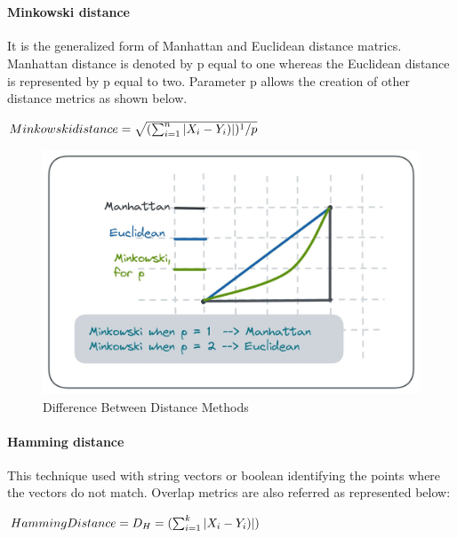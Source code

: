 \documentclass[conference]{IEEEtran}
\begin{document}
\

\paragraph{\textbf{Minkowski distance}}
It is the generalized form of Manhattan and Euclidean distance matrics. Manhattan distance is denoted by p equal to one whereas the Euclidean distance is represented by p equal to two. Parameter p allows the creation of other distance metrics as shown below.

\begin{math}
 Minkowski distance =\sqrt{(\sum_{i=1}^{n} |X_{i} - Y_{i})|)^1/p}
 \newline
\end{math}

\begin{figure}
    \centering
    \includegraphics[width=0.8\linewidth]{b.jpg}
    \caption{Difference Between Distance Methods}
    \label{fig:enter-label}
\end{figure}

\paragraph{\textbf{Hamming distance}}
This technique used with string vectors or boolean identifying the points where the vectors do not match. Overlap metrics are also referred as represented below:

\begin{math}
 Hamming Distance = D_{H}=(\sum_{i=1}^{k} |X_{i} - Y_{i})|)
 \newline
\end{math}
\end{document}
